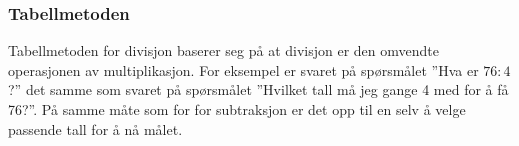 \subsubsection{Tabellmetoden}
Tabellmetoden for divisjon baserer seg på at divisjon er den omvendte operasjonen av multiplikasjon. For eksempel er svaret på spørsmålet ''Hva er $ {76:4} $?'' det samme som svaret på spørsmålet ''Hvilket tall må jeg gange 4 med for å få 76?''. På samme måte som for  for subtraksjon er det opp til en selv å velge passende tall for å nå målet.
\begin{center}
	\label{ekstbldiv}
	\parbox{0.35\linewidth}{
		} \qquad
\parbox{0.35\linewidth}{
	} \vsk

\parbox{0.415\linewidth}{
}
\end{center}
\newpage
